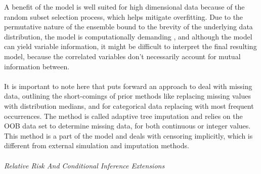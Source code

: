 \noindent A benefit of the model is well suited for high dimensional data because of the random subset selection process, which helps mitigate overfitting. Due to the permutative nature of the ensemble bound to the brevity of the underlying data distribution, the model is computationally demanding \parencite{pham_springer_2023}, and although the model can yield variable information, it might be difficult to interpret the final resulting model, because the correlated variables don't necessarily account for mutual information between.
\\\\
\noindent It is important to note here that \parencite{ishwaran_random_2008} puts forward an approach to deal with missing data, outlining the short-comings of prior methods like replacing missing values with distribution medians, and for categorical data replacing with most frequent occurrences. The method is called adaptive tree imputation and relies on the OOB data set to determine missing data, for both continuous or integer values. This method is a part of the model and deals with censoring implicitly, which is different from external simulation and imputation methods. 
\\\\
\noindent \textit{Relative Risk And Conditional Inference Extensions}
